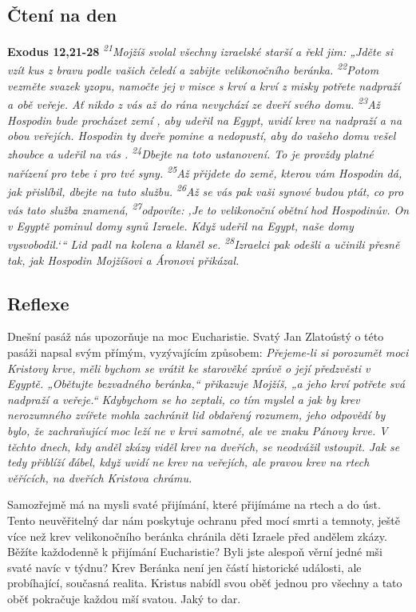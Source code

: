 \documentclass[11pt]{article}
\begin{document}
\subsection*{Čtení na den}
\textbf{Exodus 12,21-28}
\newline
\textit{
\textsuperscript{21}Mojžíš svolal všechny izraelské starší a řekl jim: „Jděte si vzít kus z bravu podle vašich čeledí a zabijte velikonočního beránka.
\textsuperscript{22}Potom vezměte svazek yzopu, namočte jej v misce s krví a krví z misky potřete nadpraží a obě veřeje. Ať nikdo z vás až do rána nevychází ze dveří svého domu.
\textsuperscript{23}Až Hospodin bude procházet zemí , aby udeřil na Egypt, uvidí krev na nadpraží a na obou veřejích. Hospodin ty dveře pomine a nedopustí, aby do vašeho domu vešel zhoubce a udeřil na vás .
\textsuperscript{24}Dbejte na toto ustanovení. To je provždy platné nařízení pro tebe i pro tvé syny.
\textsuperscript{25}Až přijdete do země, kterou vám Hospodin dá, jak přislíbil, dbejte na tuto službu.
\textsuperscript{26}Až se vás pak vaši synové budou ptát, co pro vás tato služba znamená,
\textsuperscript{27}odpovíte: ‚Je to velikonoční obětní hod Hospodinův. On v Egyptě pominul domy synů Izraele. Když udeřil na Egypt, naše domy vysvobodil.‘“ Lid padl na kolena a klaněl se.
\textsuperscript{28}Izraelci pak odešli a učinili přesně tak, jak Hospodin Mojžíšovi a Áronovi přikázal.
}

\subsection*{Reflexe}

Dnešní pasáž nás upozorňuje na moc Eucharistie. Svatý Jan Zlatoústý o této pasáži napsal svým přímým,
vyzývajícím způsobem:
\textit{Přejeme-li si porozumět moci Kristovy krve, měli bychom se vrátit ke starověké zprávě o její
předzvěsti v Egyptě. „Obětujte bezvadného beránka,“ přikazuje Mojžíš, „a jeho krví potřete
svá nadpraží a veřeje.“ Kdybychom se ho zeptali, co tím myslel a jak by krev nerozumného
zvířete mohla zachránit lid obdařený rozumem, jeho odpovědí by bylo, že zachraňující moc
leží ne v krvi samotné, ale ve znaku Pánovy krve. V těchto dnech, kdy anděl zkázy viděl krev
na dveřích, se neodvážil vstoupit. Jak se tedy přiblíží ďábel, když uvidí ne krev na veřejích, ale
pravou krev na rtech věřících, na dveřích Kristova chrámu.}

Samozřejmě má na mysli svaté přijímání, které přijímáme na rtech a do úst. Tento neuvěřitelný dar nám
poskytuje ochranu před mocí smrti a temnoty, ještě více než krev velikonočního beránka chránila děti
Izraele před andělem zkázy. Běžíte každodenně k přijímání Eucharistie? Byli jste alespoň věrní jedné mši
svaté navíc v týdnu? Krev Beránka není jen částí historické události, ale probíhající, současná realita.
Kristus nabídl svou oběť jednou pro všechny a tato oběť pokračuje každou mší svatou. Jaký to dar.
\end{document}
